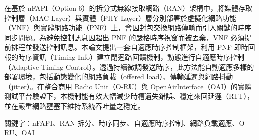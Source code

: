 \indent\hspace{2em}在基於 nFAPI（Option 6）的拆分式無線接取網路（RAN）架構中，將媒體存取控制層（MAC Layer）與實體（PHY Layer）層分別部署於虛擬化網路功能（VNF）與實體網路功能（PNF）上，會因封包交換網路傳輸而引入關鍵的時序同步問題。為避免控制訊息因超出 PNF 的嚴格時序視窗而被丟棄，VNF 必須提前排程並發送控制訊息。本論文提出一套自適應時序控制框架，利用 PNF 即時回報的時序資訊（Timing Info）建立閉迴路回饋機制，動態進行自適應時序控制（Adaptive Timing Control）。透過持續微調發送時序，此方法能自動適應多樣的部署環境，包括動態變化的網路負載（offered load）、傳輸延遲與網路抖動（jitter）。在整合商用 Radio Unit（O-RU）與 OpenAirInterface（OAI）的實體測試平台驗證下，本機制能有效大幅減少時槽遺失錯誤、穩定來回延遲（RTT），並在嚴重網路壅塞下維持系統吞吐量之穩定。

\noindent 關鍵字：nFAPI、RAN 拆分、時序同步、自適應時序控制、網路負載適應、O-RU、OAI
